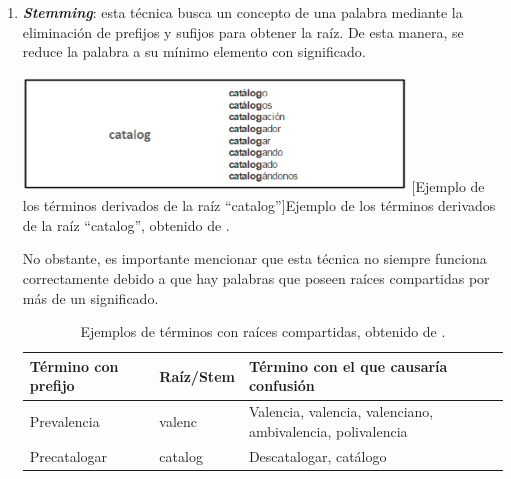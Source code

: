 \begin{enumerate}
\item \textbf{\textit{Stemming}}: esta técnica busca un concepto de una palabra mediante la eliminación de prefijos y sufijos para obtener la raíz. De esta manera, se reduce la palabra a su mínimo elemento con significado.
\begin{center}
    \includegraphics[width=0.8\textwidth]{Images/Cap 2/Stemming.png}
    [Ejemplo de los términos derivados de la raíz “catalog”]{Ejemplo de los términos derivados de la raíz “catalog”, obtenido de \cite{ref47}.}  %
\end{center}
No obstante, es importante mencionar que esta técnica no siempre funciona correctamente debido a que hay palabras que poseen raíces compartidas por más de un significado. 
\begin{table}[H]
    \centering
    \begin{tabular}{|p{3cm}|p{2.5cm}|p{6cm}|}
        \hline
        \textbf{Término con prefijo} & \textbf{Raíz/Stem} & \textbf{Término con el que causaría confusión} \\
        \hline
        Prevalencia & valenc & Valencia, valencia, valenciano, ambivalencia, polivalencia \\
        \hline
        Precatalogar & catalog & Descatalogar, catálogo \\
        \hline
    \end{tabular}
    \caption[Ejemplos de términos con raíces compartidas]{Ejemplos de términos con raíces compartidas, obtenido de \cite{ref47}.}
    \label{tabla:confusion}
\end{table}

\end{enumerate}

